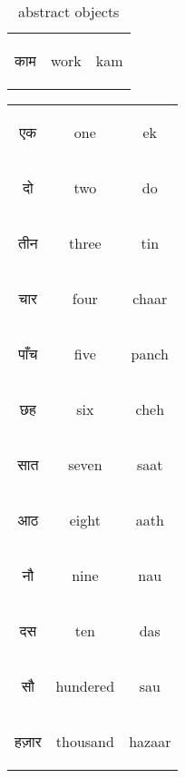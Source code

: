 \begin{table}[H]
    \centering 
    \begin{tabular}{c|c|c}
        \begin{hindi} काम \end{hindi} & work & kam \\
    \end{tabular}
    \caption{abstract objects}
    \label{tab:nouns_abstract}
\end{table}

\begin{table}[H]
    \centering
    \begin{tabular}{c|c|c}        
    \begin{hindi} एक \end{hindi} & one & ek \\
    \begin{hindi} दो  \end{hindi} & two & do \\
    \begin{hindi} तीन \end{hindi} & three & tin \\
    \begin{hindi} चार  \end{hindi} & four & chaar \\
    \begin{hindi} पाँच \end{hindi} & five & panch \\
    \begin{hindi} छह \end{hindi} & six & cheh \\
    \begin{hindi} सात \end{hindi} & seven & saat  \\
    \begin{hindi} आठ \end{hindi} & eight & aath \\
    \begin{hindi} नौ  \end{hindi} & nine & nau \\
    \begin{hindi} दस  \end{hindi} & ten & das \\
    \begin{hindi} सौ  \end{hindi} & hundered & sau \\
    \begin{hindi} हज़ार  \end{hindi} & thousand & hazaar \\

\end{tabular}
\end{table}
